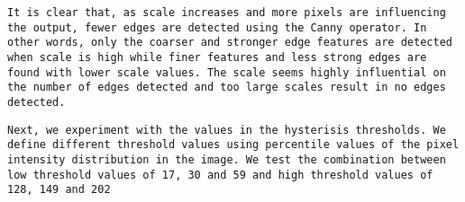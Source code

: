 \documentclass[11pt]{article}
\begin{document}
    \begin{verbatim}
It is clear that, as scale increases and more pixels are influencing the output, fewer edges are detected using the Canny operator. In other words, only the coarser and stronger edge features are detected when scale is high while finer features and less strong edges are found with lower scale values. The scale seems highly influential on the number of edges detected and too large scales result in no edges detected. 
\end{verbatim}

    \begin{verbatim}
Next, we experiment with the values in the hysterisis thresholds. We define different threshold values using percentile values of the pixel intensity distribution in the image. We test the combination between low threshold values of 17, 30 and 59 and high threshold values of 128, 149 and 202
\end{verbatim}
\end{document}
